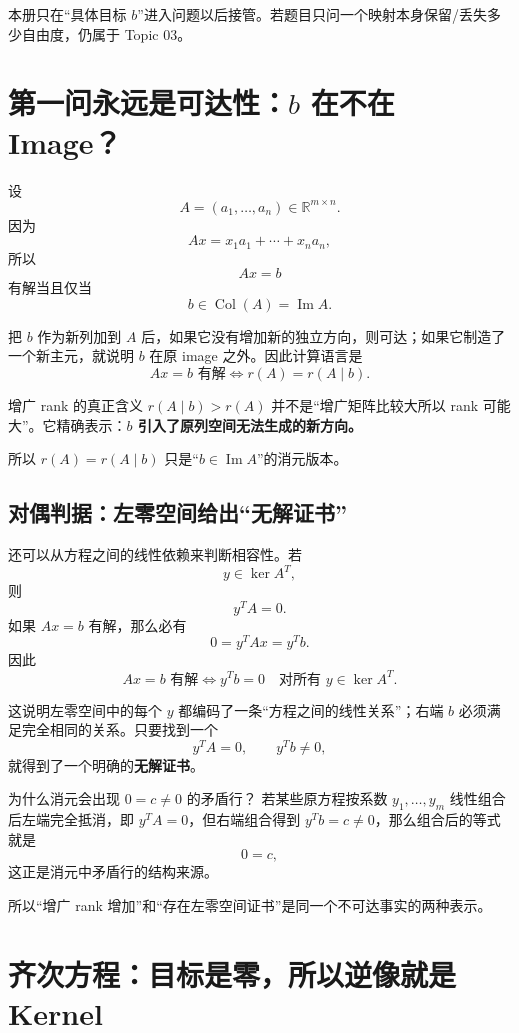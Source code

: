 \documentclass[11pt,a4paper]{ctexart}
\newcommand{\kw}[1]{\textbf{\color{deep}#1}}
\begin{document}
本册只在“具体目标 $b$”进入问题以后接管。若题目只问一个映射本身保留/丢失多少自由度，仍属于 Topic 03。

\section{第一问永远是可达性：$b$ 在不在 Image？}

设
\[
A=(a_1,\dots,a_n)\in\mathbb R^{m\times n}.
\]
因为
\[
Ax=x_1a_1+\cdots+x_na_n,
\]
所以
\[
Ax=b
\]
有解当且仅当
\[
\boxed{b\in\operatorname{Col}(A)=\operatorname{Im}A.}
\]

把 $b$ 作为新列加到 $A$ 后，如果它没有增加新的独立方向，则可达；如果它制造了一个新主元，就说明 $b$ 在原 image 之外。因此计算语言是
\[
\boxed{Ax=b\text{ 有解}\iff r(A)=r(A\mid b).}
\]

\begin{corebox}{增广 rank 的真正含义}
$r(A\mid b)>r(A)$ 并不是“增广矩阵比较大所以 rank 可能大”。它精确表示：\kw{$b$ 引入了原列空间无法生成的新方向。}

所以 $r(A)=r(A\mid b)$ 只是“$b\in\operatorname{Im}A$”的消元版本。
\end{corebox}

\subsection{对偶判据：左零空间给出“无解证书”}

还可以从方程之间的线性依赖来判断相容性。若
\[
y\in\ker A^T,
\]
则
\[
y^TA=0.
\]
如果 $Ax=b$ 有解，那么必有
\[
0=y^TAx=y^Tb.
\]
因此
\[
\boxed{
Ax=b\text{ 有解}
\iff
y^Tb=0\quad\text{对所有 }y\in\ker A^T.
}
\]

这说明左零空间中的每个 $y$ 都编码了一条“方程之间的线性关系”；右端 $b$ 必须满足完全相同的关系。只要找到一个
\[
y^TA=0,
\qquad
y^Tb\neq0,
\]
就得到了一个明确的\kw{无解证书}。

\begin{examplebox}{为什么消元会出现 $0=c\neq0$ 的矛盾行？}
若某些原方程按系数 $y_1,\dots,y_m$ 线性组合后左端完全抵消，即 $y^TA=0$，但右端组合得到 $y^Tb=c\neq0$，那么组合后的等式就是
\[
0=c,
\]
这正是消元中矛盾行的结构来源。

所以“增广 rank 增加”和“存在左零空间证书”是同一个不可达事实的两种表示。
\end{examplebox}

\section{齐次方程：目标是零，所以逆像就是 Kernel}
\end{document}
